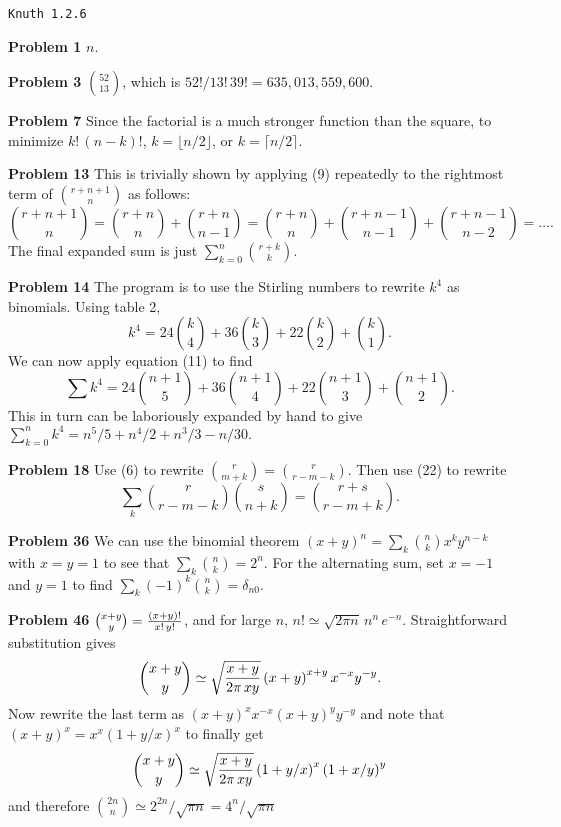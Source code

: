 \vskip 0.5in
\centerline{\tt Knuth 1.2.6}
\vskip 0.5in

\noindent
{\bf Problem 1} $n$.

\vskip 0.1in
\noindent
{\bf Problem 3} $52 \choose 13$, which is ${52! / 13! \, 39!} = 635,013,559,600.$

\vskip 0.1in
\noindent
{\bf Problem 7} Since the factorial is a much stronger function than the square,
 to minimize $k! \, \left(n-k\right)!$, $k = \lfloor n/2 \rfloor$, or
 $k = \lceil n/2 \rceil$.

\vskip 0.1in
\noindent
{\bf Problem 13} This is trivially shown by applying (9) repeatedly to the rightmost
 term of $r + n + 1 \choose n$ as follows:
 $$
   {r + n + 1 \choose n} = {r + n \choose n} + {r + n \choose n - 1} =
      {r + n \choose n} + {r + n - 1 \choose n - 1} + {r + n - 1 \choose n - 2} = \ldots.
 $$
 The final expanded sum is just $\sum_{k=0}^n {r+k \choose k}$.
    
\vskip 0.1in
\noindent
{\bf Problem 14} The program is to use the Stirling numbers to rewrite $k^4$ as binomials.
   Using table 2,
   $$k^4 = 24 {k \choose 4} + 36 {k \choose 3} + 22 {k \choose 2} + {k \choose 1}.$$
   We can now apply equation (11) to find $$\sum k^4 = 24 {n + 1 \choose 5} +
     36 { n + 1 \choose 4 } + 22 { n + 1 \choose 3 } + { n+1 \choose 2}.$$
   This in turn can be laboriously expanded by hand to give
   $\sum_{k=0}^n k^4 = n^5/5 + n^4/2 + n^3/3 - n/30.$
   
\vskip 0.1in
\noindent
{\bf Problem 18} Use (6) to rewrite ${r \choose m + k} = {r \choose r - m - k}$.  Then use
 (22) to rewrite
 $$ \sum_k {r \choose r - m - k} {s \choose n + k} = {r + s \choose r - m + k}. $$
   
\vskip 0.1in
\noindent
{\bf Problem 36} We can use the binomial theorem $\left(x+y\right)^n = \sum_{k} {n \choose k} x^k y^{n-k}$
 with $x = y = 1$ to see that $\sum_k {n \choose k} = 2^n$.  For the alternating sum, set $x=-1$ and $y=1$
 to find $\sum_k \left(-1\right)^{k} {n \choose k} = \delta_{n0}$.
 
\vskip 0.1in
\noindent
{\bf Problem 46} ${x + y \choose y} = {\left(x + y\right)! \over x! \, y!}$, and for large $n$, 
 $n! \simeq \sqrt{2 \pi n}\, n^n\, e^{-n}$.  Straightforward substitution gives 
 $${ x + y \choose y } \simeq \sqrt{ x + y \over 2 \pi \, x y } \left(x+y\right)^{x+y} x^{-x} y^{-y}.$$
 Now rewrite the last term as $\left(x+y\right)^{x} x^{-x} \left(x+y\right)^y y^{-y}$ and note that
 $\left(x+y\right)^x = x^x \left(1 + y/x\right)^x$ to finally get
 $$
   { x + y \choose y } \simeq \sqrt{ x + y \over 2 \pi \, x y } \left(1+y/x\right)^x \left(1+x/y\right)^y 
 $$
 and therefore ${2 n \choose n} \simeq 2^{2n} / \sqrt{\pi n} = 4^n / \sqrt{\pi n}$
   

